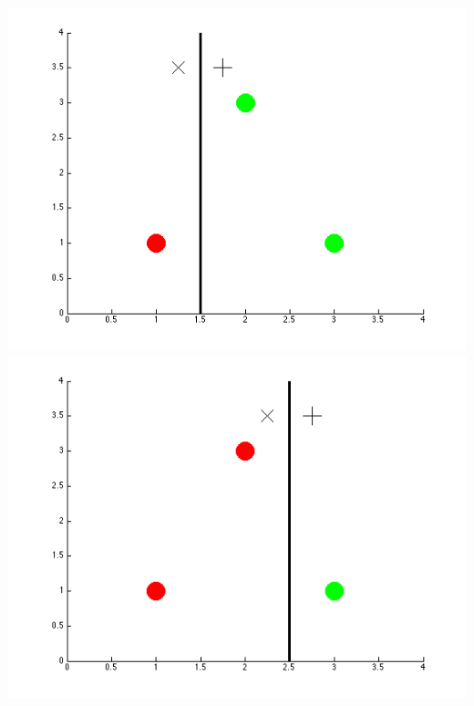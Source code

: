 \documentclass{article}
\begin{document}
\begin{enumerate}
	\includegraphics[scale=0.25]{../images/rgg} \hfill \includegraphics[scale=0.25]{../images/rgr}\\

\end{enumerate}
\end{document}
